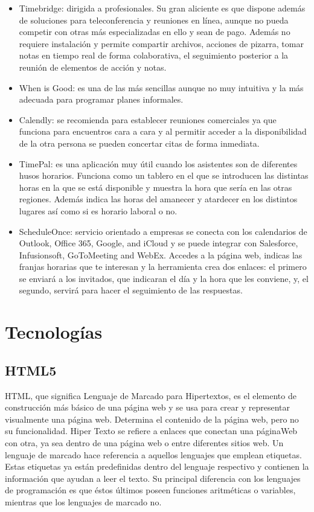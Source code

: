 \documentclass[a4paper, 12pt]{book}
\begin{document}
\begin{itemize}
  \item Timebridge: dirigida a profesionales. Su gran aliciente es que dispone adem\'as de soluciones para teleconferencia y reuniones en l\'inea, aunque no pueda competir con otras m\'as especializadas en ello y sean de pago. Adem\'as no requiere instalaci\'on y permite compartir archivos, acciones de pizarra, tomar notas en tiempo real de forma colaborativa, el seguimiento posterior a la reuni\'on de elementos de acci\'on y notas.
 \item When is Good: es una de las m\'as sencillas aunque no muy intuitiva y la m\'as adecuada para programar planes informales.
 \item Calendly: se recomienda para establecer reuniones comerciales ya que funciona para encuentros cara a cara y al permitir acceder a la disponibilidad de la otra persona se pueden concertar citas de forma inmediata. 
 \item TimePal: es una aplicaci\'on muy \'util cuando los asistentes son de diferentes husos horarios. Funciona como un tablero en el que se introducen las distintas horas en la que se est\'a disponible y muestra la hora que ser\'ia en las otras regiones. Adem\'as indica las horas del amanecer y atardecer en los distintos lugares as\'i como si es horario laboral o no.
 \item ScheduleOnce: servicio orientado a empresas se conecta con los calendarios de Outlook, Office 365, Google, and iCloud y se puede integrar con Salesforce, Infusionsoft, GoToMeeting and WebEx.  Accedes a la p\'agina web, indicas las franjas horarias que te interesan y la herramienta crea dos enlaces: el primero se enviar\'a a los invitados, que indicaran el d\'ia y la hora que les conviene, y, el segundo, servir\'a para hacer el seguimiento de las respuestas.
\end{itemize}


\section{Tecnolog\'ias}
\label{sec:seccion}


\subsection{HTML5}
\label{subsec:estilo}

HTML, que significa Lenguaje de Marcado para Hipertextos, es el elemento de construcci\'on
m\'as b\'asico de una p\'agina web y se usa para crear y representar visualmente una p\'agina web.
Determina el contenido de la p\'agina web, pero no su funcionalidad. Hiper Texto se refiere a enlaces
que conectan una p\'aginaWeb con otra, ya sea dentro de una p\'agina web o entre diferentes
sitios web. Un lenguaje de marcado hace referencia a aquellos lenguajes que emplean etiquetas.
Estas etiquetas ya est\'an predefinidas dentro del lenguaje respectivo y contienen la informaci\'on
que ayudan a leer el texto. Su principal diferencia con los lenguajes de programaci\'on es que
\'estos \'ultimos poseen funciones aritm\'eticas o variables, mientras que los lenguajes de marcado
no.
\end{document}
